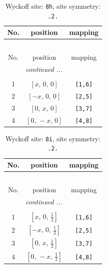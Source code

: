 \documentclass[fleqn,8pt]{jsarticle}
\begin{document}
\renewcommand{\arraystretch}{1.2}
\begin{longtable}{ccc}
\caption{Wyckoff site: {\tt 8h}, site symmetry: {\tt .2.}}
 \\
 \hline \hline
No. & position & mapping \\ \hline \endfirsthead

\multicolumn{2}{l}{\tablename\ \thetable{}} \\
 \hline \hline
No. & position & mapping \\ \hline \endhead

 \hline \hline
\multicolumn{2}{r}{\footnotesize\it continued ...} \\ \endfoot

 \hline \hline
\multicolumn{2}{r}{} \\ \endlastfoot

1 & $\left[ x,\, 0,\, 0 \right]$ & {\tt [1,6]} \\ \hline
2 & $\left[ - x,\, 0,\, 0 \right]$ & {\tt [2,5]} \\ \hline
3 & $\left[ 0,\, x,\, 0 \right]$ & {\tt [3,7]} \\ \hline
4 & $\left[ 0,\, - x,\, 0 \right]$ & {\tt [4,8]} \\
\end{longtable}
\renewcommand{\arraystretch}{1.2}
\begin{longtable}{ccc}
\caption{Wyckoff site: {\tt 8i}, site symmetry: {\tt .2.}}
 \\
 \hline \hline
No. & position & mapping \\ \hline \endfirsthead

\multicolumn{2}{l}{\tablename\ \thetable{}} \\
 \hline \hline
No. & position & mapping \\ \hline \endhead

 \hline \hline
\multicolumn{2}{r}{\footnotesize\it continued ...} \\ \endfoot

 \hline \hline
\multicolumn{2}{r}{} \\ \endlastfoot

1 & $\left[ x,\, 0,\, \frac{1}{2} \right]$ & {\tt [1,6]} \\ \hline
2 & $\left[ - x,\, 0,\, \frac{1}{2} \right]$ & {\tt [2,5]} \\ \hline
3 & $\left[ 0,\, x,\, \frac{1}{2} \right]$ & {\tt [3,7]} \\ \hline
4 & $\left[ 0,\, - x,\, \frac{1}{2} \right]$ & {\tt [4,8]} \\
\end{longtable}
\end{document}
